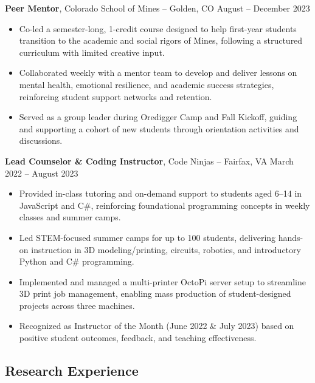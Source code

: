 \documentclass[11pt]{article}       %
\begin{document}
\textbf{Peer Mentor}, Colorado School of Mines -- Golden, CO \hfill August -- December 2023
\vspace{-5pt}
\begin{itemize}
  \item Co-led a semester-long, 1-credit course designed to help first-year students transition to the academic and social rigors of Mines, following a structured curriculum with limited creative input.
  \item Collaborated weekly with a mentor team to develop and deliver lessons on mental health, emotional resilience, and academic success strategies, reinforcing student support networks and retention.
  \item Served as a group leader during Oredigger Camp and Fall Kickoff, guiding and supporting a cohort of new students through orientation activities and discussions.
\end{itemize}

\newpage
\textbf{Lead Counselor \& Coding Instructor}, Code Ninjas -- Fairfax, VA \hfill March 2022 -- August 2023
\vspace{-5pt}
\begin{itemize}
    \item Provided in-class tutoring and on-demand support to students aged 6–14 in JavaScript and C\#, reinforcing foundational programming concepts in weekly classes and summer camps.
    \item Led STEM-focused summer camps for up to 100 students, delivering hands-on instruction in 3D modeling/printing, circuits, robotics, and introductory Python and C\# programming.
    \item Implemented and managed a multi-printer OctoPi server setup to streamline 3D print job management, enabling mass production of student-designed projects across three machines.
    \item Recognized as Instructor of the Month (June 2022 \& July 2023) based on positive student outcomes, feedback, and teaching effectiveness.
\end{itemize}

\vspace{-5pt}
\subsection*{Research Experience}
\vspace{3pt}
\end{document}
